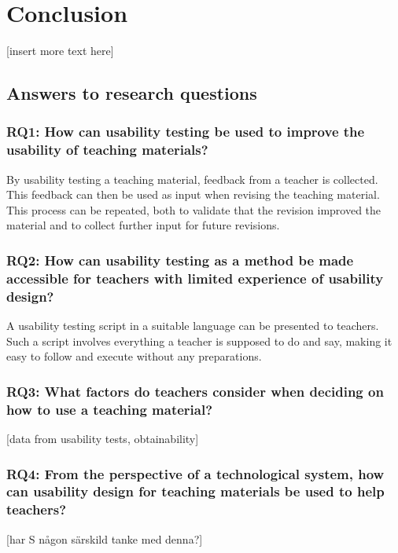 \chapter{Conclusion}
[insert more text here]


\section{Answers to research questions}

\subsection{RQ1: How can usability testing be used to improve the usability of teaching materials?}
By usability testing a teaching material, feedback from a teacher is collected. This feedback can then be 
used as input when revising the teaching material. This process can be repeated, both to validate that the 
revision improved the material and to collect further input for future revisions.

\subsection{RQ2: How can usability testing as a method be made accessible for teachers with limited experience of 
usability design?}
A usability testing script in a suitable language can be presented to teachers. Such a script involves 
everything a teacher is supposed to do and say, making it easy to follow and execute without any preparations.

\subsection{RQ3: What factors do teachers consider when deciding on how to use a teaching material?}
[data from usability tests, obtainability]

\subsection{RQ4: From the perspective of a technological system, how can usability design for teaching materials 
be used to help teachers?}
[har S någon särskild tanke med denna?] 